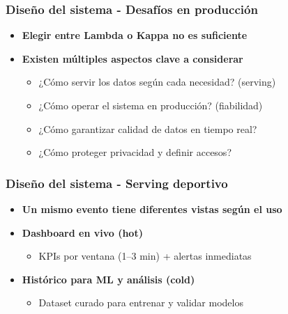 \documentclass[aspectratio=169]{beamer}
\begin{document}
\begin{frame}
\frametitle{Diseño del sistema - Desafíos en producción}
\begin{itemize}

  \item \textbf{Elegir entre Lambda o Kappa no es suficiente}

  \vspace{1em}

  \item \textbf{Existen múltiples aspectos clave a considerar}
  \begin{itemize}
    \item ¿Cómo servir los datos según cada necesidad? (serving)
    \item ¿Cómo operar el sistema en producción? (fiabilidad)
    \item ¿Cómo garantizar calidad de datos en tiempo real?
    \item ¿Cómo proteger privacidad y definir accesos?
  \end{itemize}

\end{itemize}
\end{frame}

\begin{frame}
\frametitle{Diseño del sistema - Serving deportivo}
\begin{itemize}
  \item \textbf{Un mismo evento tiene diferentes vistas según el uso}

  \vspace{0.6em}

  \item \textbf{Dashboard en vivo (hot)}
  \begin{itemize}
    \item KPIs por ventana (1--3 min) + alertas inmediatas
  \end{itemize}

  \vspace{0.6em}

  \item \textbf{Histórico para ML y análisis (cold)}
  \begin{itemize}
    \item Dataset curado para entrenar y validar modelos
  \end{itemize}
\end{itemize}
\end{frame}
\end{document}
